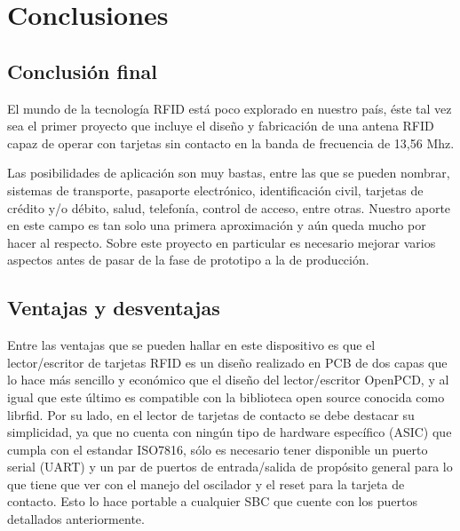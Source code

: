 \chapter{Conclusiones}

\section{Conclusión final}
El mundo de la tecnología RFID está poco explorado en nuestro país, éste 
tal vez sea el primer proyecto que incluye el diseño y fabricación de una 
antena RFID capaz de operar con tarjetas sin contacto en la banda de
frecuencia de 13,56 Mhz.

Las posibilidades de aplicación son muy bastas, entre las que se pueden 
nombrar, sistemas de transporte, pasaporte electrónico, identificación 
civil, tarjetas de crédito y/o débito, salud, telefonía, control de acceso,
entre otras.
Nuestro aporte en este campo es tan solo una primera aproximación y aún 
queda mucho por hacer al respecto. Sobre este proyecto en particular es
necesario mejorar varios aspectos antes de pasar de la fase de prototipo
a la de producción.




\section{Ventajas y desventajas}
Entre las ventajas que se pueden hallar en este dispositivo es que el lector/escritor de tarjetas RFID es un diseño realizado en PCB de dos capas que lo hace más sencillo y económico que el diseño del lector/escritor OpenPCD, y al igual que este último es compatible con la biblioteca open source conocida como librfid.
Por su lado, en el lector de tarjetas de contacto se debe destacar su simplicidad, ya que no cuenta con ningún tipo de hardware específico (ASIC) que cumpla con el estandar ISO7816, sólo es necesario tener disponible un puerto serial (UART) y un par de puertos de entrada/salida de propósito general para lo que tiene que ver con el manejo del oscilador y el reset para la tarjeta de contacto. Esto lo hace portable a cualquier SBC que cuente con los puertos detallados anteriormente.


